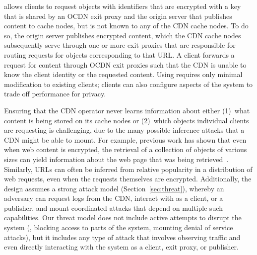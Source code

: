\system{} allows clients to request objects with identifiers that
are encrypted with a key that is shared by an OCDN exit proxy and the origin server
that publishes content to cache nodes, but is not known to any of the CDN
cache nodes. To do so, the origin server publishes encrypted content, 
which the CDN cache nodes subsequently serve through one or more exit proxies that are responsible for routing requests for objects corresponding to that URL.  A client forwards a request for content through OCDN exit proxies such that the CDN is unable to know the client identity or the requested content. Using \system{} requires only minimal modification to existing clients; clients can also configure aspects of the system to trade off performance for privacy.

Ensuring that the CDN operator never learns information about either (1)~what
content is being stored on its cache nodes or (2)~which objects individual
clients are requesting is challenging, due to the many possible inference
attacks that a CDN might be able to mount. For example, previous work has
shown that even when web content is encrypted, the retrieval of a collection
of objects of various sizes can yield information about the web page that was
being retrieved~\cite{panchenko2016website, cai2012touching}. Similarly, URLs
can often be inferred from relative popularity in a distribution of web
requests, even when the requests themselves are encrypted. Additionally, the
\system{} design assumes a strong attack model (Section~\ref{sec:threat}),
whereby an adversary can request logs from the CDN, interact with \system{} as
a client, or a publisher, and mount coordinated attacks that depend on
multiple such capabilities. Our threat model does not include active attempts
to disrupt the system (\eg, blocking access to parts of the system, mounting
denial of service attacks), but it includes any type of attack
that involves observing traffic and even directly interacting with the system
as a client, exit proxy, or publisher.

